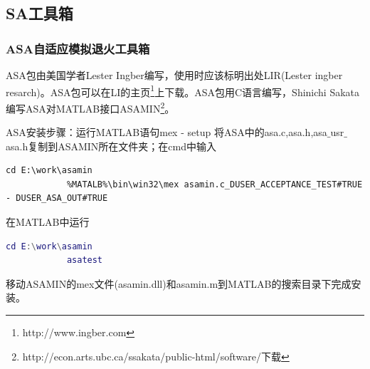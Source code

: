     \subsection{SA工具箱}
        \subsubsection{ASA自适应模拟退火工具箱}
            \par
            ASA包由美国学者Lester Ingber编写，使用时应该标明出处LIR(Lester ingber resarch)。ASA包可以在LI的主页\footnote{http://www.ingber.com}上下载。ASA包用C语言编写，Shinichi Sakata编写ASA对MATLAB接口ASAMIN\footnote{http://econ.arts.ubc.ca/ssakata/public-html/software/下载}。
            \par
            ASA安装步骤：运行MATLAB语句mex - setup 将ASA中的asa.c,asa.h,asa$\_$usr$\_$asa.h复制到ASAMIN所在文件夹；在cmd中输入
            \begin{lstlisting}[]
            cd E:\work\asamin
            %MATALB%\bin\win32\mex asamin.c_DUSER_ACCEPTANCE_TEST#TRUE - DUSER_ASA_OUT#TRUE
            \end{lstlisting}
            在MATLAB中运行
            \begin{lstlisting}[language = Matlab]
            cd E:\work\asamin
            asatest
            \end{lstlisting}
            移动ASAMIN的mex文件(asamin.dll)和asamin.m到MATLAB的搜索目录下完成安装。
